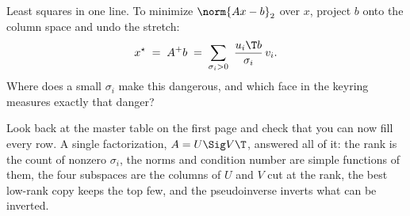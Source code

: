 
\begin{yourturn}
Least squares in one line. To minimize $\norm{Ax-b}_2$ over $x$, project $b$ onto the column
space and undo the stretch:
\[
  x^\star \;=\; A^{+}b \;=\; \sum_{\sigma_i>0}\ \frac{u_i\T b}{\sigma_i}\,v_i .
\]
Where does a small $\sigma_i$ make this dangerous, and which face in the keyring measures exactly
that danger? \fillin[4cm]
\end{yourturn}

\begin{strand}
Look back at the master table on the first page and check that you can now fill every row.
A single factorization, $A=U\Sig V\T$, answered all of it: the rank is the count of nonzero
$\sigma_i$, the norms and condition number are simple functions of them, the four subspaces are
the columns of $U$ and $V$ cut at the rank, the best low-rank copy keeps the top few, and the
pseudoinverse inverts what can be inverted. 
\end{strand}

